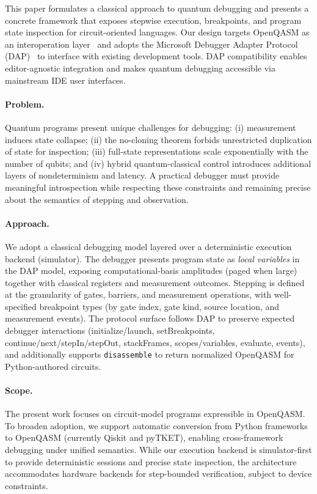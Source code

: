 \documentclass[12pt]{article}
\begin{document}
This paper formulates a classical approach to quantum debugging and presents a concrete framework that exposes stepwise execution, breakpoints, and program state inspection for circuit-oriented languages. Our design targets OpenQASM as an interoperation layer~\cite{openqasm2,openqasm3} and adopts the Microsoft Debugger Adapter Protocol (DAP)~\cite{dap} to interface with existing development tools. DAP compatibility enables editor-agnostic integration and makes quantum debugging accessible via mainstream IDE user interfaces.

\paragraph{Problem.}
Quantum programs present unique challenges for debugging: (i) measurement induces state collapse; (ii) the no-cloning theorem forbids unrestricted duplication of state for inspection; (iii) full-state representations scale exponentially with the number of qubits; and (iv) hybrid quantum-classical control introduces additional layers of nondeterminism and latency. A practical debugger must provide meaningful introspection while respecting these constraints and remaining precise about the semantics of stepping and observation.

\paragraph{Approach.}
We adopt a classical debugging model layered over a deterministic execution backend (simulator). The debugger presents program state as \emph{local variables} in the DAP model, exposing computational-basis amplitudes (paged when large) together with classical registers and measurement outcomes. Stepping is defined at the granularity of gates, barriers, and measurement operations, with well-specified breakpoint types (by gate index, gate kind, source location, and measurement events). The protocol surface follows DAP to preserve expected debugger interactions (initialize/launch, setBreakpoints, continue/next/stepIn/stepOut, stackFrames, scopes/variables, evaluate, events), and additionally supports \texttt{disassemble} to return normalized OpenQASM for Python-authored circuits.



\paragraph{Scope.}
The present work focuses on circuit-model programs expressible in OpenQASM. To broaden adoption, we support automatic conversion from Python frameworks to OpenQASM (currently Qiskit and pyTKET), enabling cross-framework debugging under unified semantics. While our execution backend is simulator-first to provide deterministic sessions and precise state inspection, the architecture accommodates hardware backends for step-bounded verification, subject to device constraints.
\end{document}
